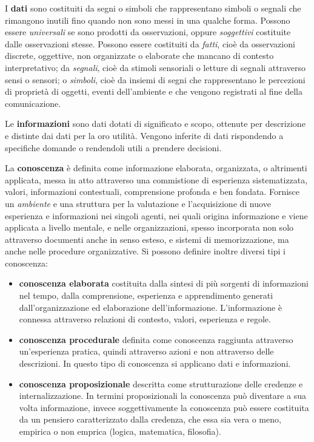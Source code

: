 \documentclass[a4paper]{extarticle}
\begin{document}
I \textbf{dati} sono costituiti da segni o simboli che rappresentano simboli o segnali che rimangono inutili fino  quando non sono messi in una qualche forma.  Possono essere \textit{universali} se sono prodotti da osservazioni, oppure \textit{soggettivi} costituite dalle osservazioni stesse. Possono essere costituiti da \textit{fatti}, cioè da osservazioni discrete, oggettive, non organizzate o elaborate che mancano di contesto interpretativo; da \textit{segnali}, cioè da stimoli sensoriali o letture di segnali attraverso sensi o sensori; o \textit{simboli}, cioè da insiemi di segni che rappresentano le percezioni di proprietà di oggetti, eventi dell'ambiente e che vengono registrati al fine della comunicazione.

Le \textbf{informazioni} sono dati dotati di significato e scopo, ottenute per descrizione e distinte dai dati per la oro utilità. Vengono inferite di dati rispondendo a specifiche domande o rendendoli utili a prendere decisioni.

La  \textbf{conoscenza} è definita come informazione elaborata, organizzata, o altrimenti applicata, messa in atto attraverso una commistione di esperienza sistematizzata, valori, informazioni contestuali, comprensione profonda e ben fondata. Fornisce un \textit{ambiente} e una struttura per la valutazione e l'acquisizione di nuove esperienza e informazioni nei singoli agenti, nei quali origina informazione e viene applicata a livello mentale, e nelle organizzazioni, spesso incorporata non solo attraverso documenti anche in senso esteso, e sistemi di memorizzazione, ma anche nelle procedure organizzative. Si possono definire inoltre diversi tipi i conoscenza:
\begin{itemize}
	\item \textbf{conoscenza elaborata} costituita dalla sintesi di più sorgenti di informazioni nel tempo, dalla comprensione, esperienza e apprendimento generati dall'organizzazione ed elaborazione dell'informazione. L'informazione è connessa attraverso relazioni di contesto, valori, esperienza e regole.
	
	\item \textbf{conoscenza procedurale} definita come conoscenza raggiunta attraverso un'esperienza pratica, quindi attraverso azioni e non attraverso delle descrizioni. In questo tipo di conoscenza si applicano dati e informazioni.
	
	\item \textbf{conoscenza proposizionale} descritta come strutturazione delle credenze e internalizzazione. In termini proposizionali la conoscenza può diventare a sua volta informazione, invece soggettivamente la conoscenza può essere costituita da un pensiero caratterizzato dalla credenza, che essa sia vera o meno, empirica o non emprica (logica, matematica, filosofia).
\end{itemize}
\end{document}
